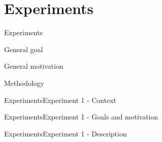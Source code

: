 \documentclass[xcolor=table]{beamer}
\begin{document}
\section{Experiments}
\begin{frame}{Experiments}
    \begin{block}{General goal}{

    }\end{block}
    \begin{block}{General motivation}{

    }\end{block}
    \begin{block}{Methodology}{
    }\end{block}



\end{frame}




\begin{frame}{Experiments}{Experiment 1 - Context}


\end{frame}



\begin{frame}{Experiments}{Experiment 1 - Goals and motivation}



\end{frame}


\begin{frame}{Experiments}{Experiment 1 - Description}


\end{frame}
\end{document}

